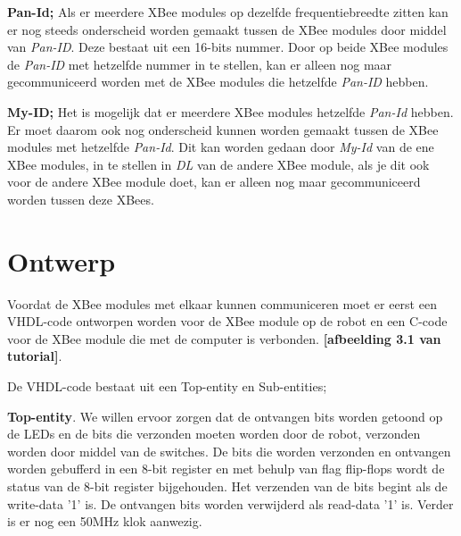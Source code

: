 \documentclass{report}
\begin{document}
\textbf{Pan-Id;}
\newline
Als er meerdere XBee modules op dezelfde frequentiebreedte zitten kan er nog steeds onderscheid worden gemaakt tussen de XBee modules door middel van \textit{Pan-ID}. Deze bestaat uit een 16-bits nummer. Door op beide XBee modules de \textit{Pan-ID}  met hetzelfde nummer in te stellen, kan er alleen nog maar gecommuniceerd worden met de XBee modules die hetzelfde \textit{Pan-ID} hebben.
\newline

\textbf{My-ID;}
\newline
Het is mogelijk dat er meerdere XBee modules hetzelfde\textit{ Pan-Id} hebben. Er moet daarom ook nog onderscheid kunnen worden gemaakt tussen de XBee modules met hetzelfde \textit{Pan-Id}. Dit kan worden gedaan door \textit{My-Id} van de ene XBee modules, in te stellen in \textit{DL} van de andere XBee module, als je dit ook voor de andere XBee module doet, kan er alleen nog maar gecommuniceerd worden tussen deze XBees.


\section{Ontwerp}
Voordat de XBee modules met elkaar kunnen communiceren moet er eerst een VHDL-code ontworpen worden voor de XBee module op de robot en een C-code voor de XBee module die met de computer is verbonden.
\textbf{[afbeelding 3.1 van tutorial]}.
\newline

De VHDL-code bestaat uit een Top-entity en Sub-entities;
\newline

\textbf{Top-entity}.
\newline
We willen ervoor zorgen dat de ontvangen bits worden getoond op de LEDs en de bits die verzonden moeten worden door de robot, verzonden worden door middel van de switches. De bits die worden verzonden en ontvangen worden gebufferd in een 8-bit register en met behulp van flag flip-flops wordt de status van de 8-bit register bijgehouden. Het verzenden van de bits begint als de write-data '1' is. De ontvangen bits worden verwijderd als read-data '1' is. Verder is er nog een 50MHz klok aanwezig.
\newline
\end{document}
